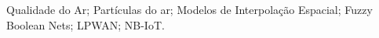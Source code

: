 \noindent Qualidade do Ar; Partículas do ar; Modelos de Interpolação Espacial; Fuzzy Boolean Nets; LPWAN; NB-IoT.